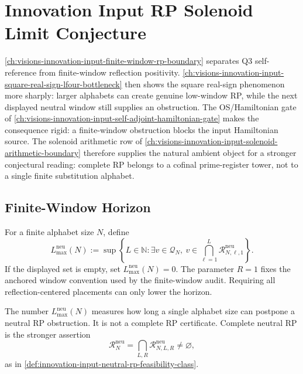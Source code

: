 \chapter{Innovation Input RP Solenoid Limit Conjecture}
\label{ch:visions-innovation-input-rp-solenoid-limit-conjecture}

\autoref{ch:visions-innovation-input-finite-window-rp-boundary}
separates Q3 self-reference from finite-window reflection positivity.
\autoref{ch:visions-innovation-input-square-real-sign-lfour-bottleneck}
then shows the square real-sign phenomenon more sharply: larger alphabets
can create genuine low-window RP, while the next displayed neutral window
still supplies an obstruction. The OS/Hamiltonian gate of
\autoref{ch:visions-innovation-input-self-adjoint-hamiltonian-gate} makes
the consequence rigid: a finite-window obstruction blocks the input
Hamiltonian source. The solenoid arithmetic row of
\autoref{ch:visions-innovation-input-solenoid-arithmetic-boundary}
therefore supplies the natural ambient object for a stronger conjectural
reading: complete RP belongs to a cofinal prime-register tower, not to a
single finite substitution alphabet.

\section{Finite-Window Horizon}
\label{sec:innovation-input-rp-finite-window-horizon}

\begin{definition}
\label{def:innovation-input-anchored-neutral-rp-horizon}
For a finite alphabet size $N$, define
$$
L_{\max}^{\mathrm{neu}}(N)
:=
\sup
\left\{
L\in\mathbb N:
\exists v\in\mathcal Q_N,\
v\in\bigcap_{\ell=1}^{L}\mathcal R_{N,\ell,1}^{\mathrm{neu}}
\right\}.
$$
If the displayed set is empty, set
$L_{\max}^{\mathrm{neu}}(N)=0$. The parameter $R=1$ fixes the anchored
window convention used by the finite-window audit. Requiring all
reflection-centered placements can only lower the horizon.
\end{definition}

\begin{principle}
\label{prin:innovation-input-rp-horizon-reading}
The number $L_{\max}^{\mathrm{neu}}(N)$ measures how long a single
alphabet size can postpone a neutral RP obstruction. It is not a complete
RP certificate. Complete neutral RP is the stronger assertion
$$
\mathcal R_N^{\mathrm{neu}}
=
\bigcap_{L,R}\mathcal R_{N,L,R}^{\mathrm{neu}}
\ne\varnothing,
$$
as in
\autoref{def:innovation-input-neutral-rp-feasibility-class}.
\end{principle}

